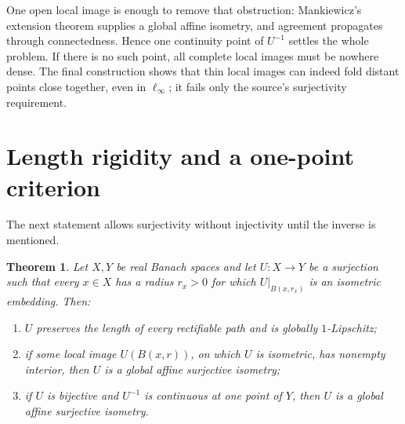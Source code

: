 \documentclass[11pt]{article}
\newtheorem{theorem}{Theorem}
\begin{document}
One open local image is enough to remove that obstruction: Mankiewicz's
extension theorem supplies a global affine isometry, and agreement propagates
through connectedness.  Hence one continuity point of $U^{-1}$ settles the
whole problem.  If there is no such point, all complete local images must be
nowhere dense.  The final construction shows that thin local images can
indeed fold distant points close together, even in $\ell_\infty$; it fails
only the source's surjectivity requirement.

\section{Length rigidity and a one-point criterion}

The next statement allows surjectivity without injectivity until the inverse
is mentioned.

\begin{theorem}\label{thm:structure}
Let $X,Y$ be real Banach spaces and let $U:X\to Y$ be a surjection such that
every $x\in X$ has a radius $r_x>0$ for which $U|_{B(x,r_x)}$ is an
isometric embedding.  Then:
\begin{enumerate}
\item $U$ preserves the length of every rectifiable path and is globally
      $1$-Lipschitz;
\item if some local image $U(B(x,r))$, on which $U$ is isometric, has
      nonempty interior, then $U$ is a global affine surjective isometry;
\item if $U$ is bijective and $U^{-1}$ is continuous at one point of $Y$,
      then $U$ is a global affine surjective isometry.
\end{enumerate}
\end{theorem}
\end{document}
